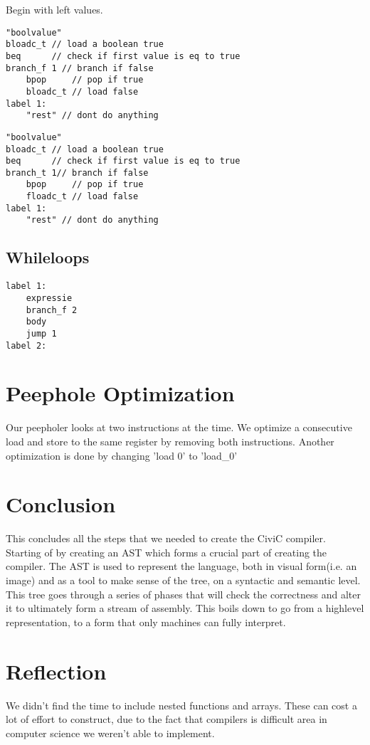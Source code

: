 \documentclass[a4paper]{article}
\begin{document}
Begin with left values.
\begin{lstlisting}
"boolvalue"
bloadc_t // load a boolean true
beq      // check if first value is eq to true
branch_f 1 // branch if false
    bpop     // pop if true
    bloadc_t // load false
label 1:
    "rest" // dont do anything
\end{lstlisting}

\begin{lstlisting}
"boolvalue"
bloadc_t // load a boolean true
beq      // check if first value is eq to true
branch_t 1// branch if false
    bpop     // pop if true
    floadc_t // load false
label 1:
    "rest" // dont do anything
\end{lstlisting}

\subsection{Whileloops}
\begin{lstlisting}
label 1:
    expressie
    branch_f 2
    body
    jump 1
label 2:
\end{lstlisting}


\section{Peephole Optimization}
Our peepholer looks at two instructions at the time. We optimize a consecutive
load and store to the same register by removing both instructions.
Another optimization is done by changing 'load 0' to 'load\_0'



\section{Conclusion}
This concludes all the steps that we needed to create the CiviC compiler.
Starting of by creating an AST which forms a crucial part of creating the
compiler. The AST is used to represent the language, both in visual form(i.e.
an image) and as a tool to make sense of the tree, on a syntactic and semantic
level. This tree goes through a series of phases that will check the
correctness and alter it to ultimately form a stream of assembly. This boils
down to go from a highlevel representation, to a form that only machines can
fully interpret.

\section{Reflection}
We didn't find the time to include nested functions and arrays. These can cost
a lot of effort to construct, due to the fact that compilers is difficult area
in computer science we weren't able to implement.
\end{document}
